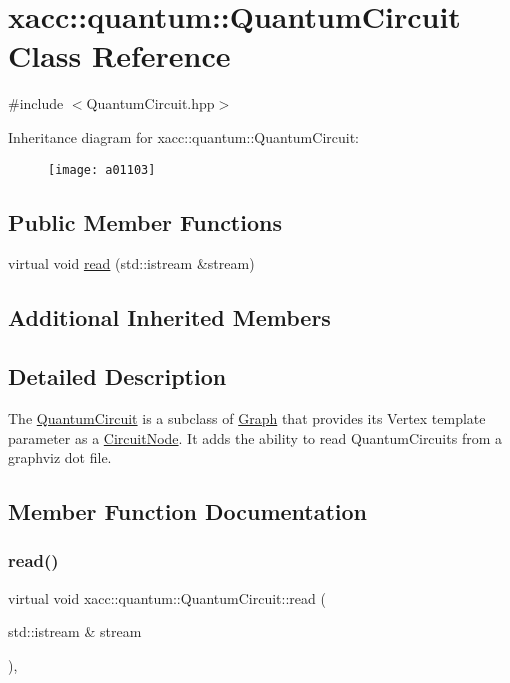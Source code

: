 \hypertarget{a01103}{}\section{xacc\+:\+:quantum\+:\+:Quantum\+Circuit Class Reference}
\label{a01103}


{\ttfamily \#include $<$Quantum\+Circuit.\+hpp$>$}

Inheritance diagram for xacc\+:\+:quantum\+:\+:Quantum\+Circuit\+:\begin{figure}[H]
\begin{center}
\leavevmode
\texttt{[image: a01103]}
\end{center}
\end{figure}
\subsection*{Public Member Functions}
\begin{DoxyCompactItemize}
\item 
virtual void \hyperlink{a01103_af7a7f4a487d493fe8a4ed1f76cefd731}{read} (std\+::istream \&stream)
\end{DoxyCompactItemize}
\subsection*{Additional Inherited Members}


\subsection{Detailed Description}
The \hyperlink{a01103}{Quantum\+Circuit} is a subclass of \hyperlink{a01211}{Graph} that provides its Vertex template parameter as a \hyperlink{a01023}{Circuit\+Node}. It adds the ability to read Quantum\+Circuits from a graphviz dot file. 

\subsection{Member Function Documentation}
\mbox{\label{a01103_af7a7f4a487d493fe8a4ed1f76cefd731}} 
\subsubsection{\texorpdfstring{read()}{read()}}
{\footnotesize\ttfamily virtual void xacc\+::quantum\+::\+Quantum\+Circuit\+::read (\begin{DoxyParamCaption}\item[{std\+::istream \&}]{stream }\end{DoxyParamCaption})\hspace{0.3cm}{\ttfamily [inline]}, {\ttfamily [virtual]}}

